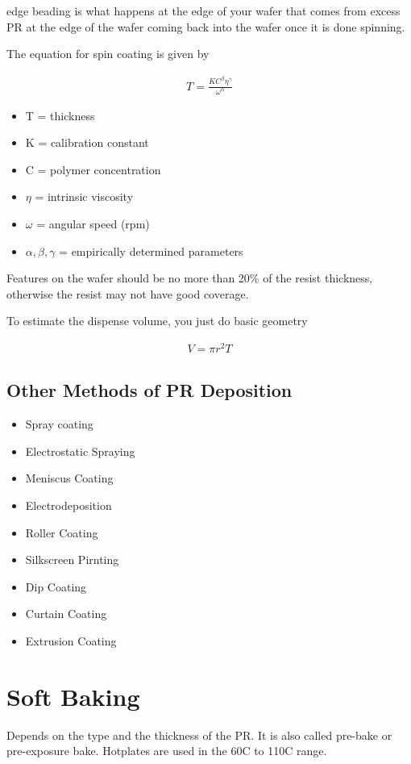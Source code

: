 \documentclass[fleqn]{report}
\newcommand{\equations} [1] {
\begin{gather*}
#1
\end{gather*}
}
\begin{document}
edge beading is what happens at the edge of your wafer that comes from 
excess PR at the edge of the wafer coming back into the wafer once it is done 
spinning.

The equation for spin coating is given by 
\equations{
    T 
    =
    \frac{K C^{\beta} \eta^{\gamma}}{\omega^{\alpha}}
}
\begin{itemize}
    \item 
    T = thickness 
    \item 
    K = calibration constant 
    \item 
    C = polymer concentration 
    \item 
    $\eta$ = intrinsic viscosity 
    \item 
    $\omega$ = angular speed (rpm)
    \item 
    $\alpha, \beta, \gamma$ = empirically determined parameters
\end{itemize}

Features on the wafer should be no more than 20\% of the 
resist thickness, otherwise the resist may not have good coverage. 

To estimate the dispense volume, you just do basic geometry 
\equations{
    V 
    =
    \pi r^2 T 
}


\subsection{Other Methods of PR Deposition}
\begin{itemize}
    \item 
    Spray coating 
    \item 
    Electrostatic Spraying 
    \item 
    Meniscus Coating 
    \item 
    Electrodeposition 
    \item 
    Roller Coating 
    \item 
    Silkscreen Pirnting 
    \item 
    Dip Coating
    \item 
    Curtain Coating 
    \item 
    Extrusion Coating
\end{itemize}

\section{Soft Baking}
Depends on the type and the thickness of the PR. 
It is also called pre-bake or pre-exposure bake. 
Hotplates are used in the 60C to 110C range. 
\end{document}
